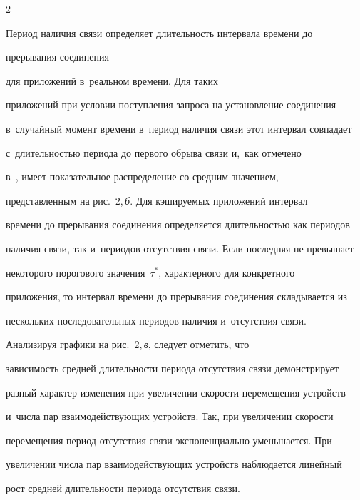 \begin{multicols}{2}








  


  Период наличия связи определяет длительность интервала времени до 


прерывания соединения


 для приложений в~реальном времени. Для таких 


приложений при условии поступления запроса на уста\-нов\-ле\-ние соединения 


в~случайный момент времени в~период наличия связи этот интервал совпадает 


с~длительностью периода до первого обрыва связи и,~как отмечено  


в~\cite{14-g1}, имеет показательное распределение со средним значением, 


представленным на рис.~2,\,\textit{б}. Для кэшируемых приложений интервал 


времени до прерывания соединения определяется длительностью как периодов 


наличия связи, так и~периодов отсутствия связи. Если последняя не превышает 


некоторого порогового значения~$\tau^*$, характерного для конкретного 


приложения, то интервал времени до прерывания соединения складывается из 


нескольких последовательных периодов наличия и~отсутствия связи. 





Анализируя графики на рис.~2,\,\textit{в}, следует от\-метить, что 


зависимость средней длительности пери\-о\-да отсутствия связи демонстрирует 


разный характер изменения при увеличении ско\-рости перемещения устройств 


и~числа пар взаимодействующих устройств. Так, при увеличении скорости 


перемещения период отсутствия связи экспоненциально уменьшается. При 


увеличении числа пар взаимодействующих устройств наблюдается линейный 


рост средней длительности периода отсутствия \mbox{связи}.






\end{multicols}

